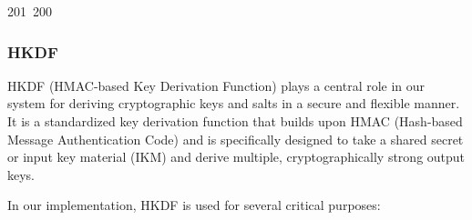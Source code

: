 201~200~\documentclass{article}
\begin{document}
	                                                                                                                                                                                                                                                                                                	                                                                                                                                        	    	                                                                                                	                                                                                                                                                                                                                                                \subsubsection{HKDF}

	                                                                                                                                                                                                                                                                                                	                                                                                                                                        	    	                                                                                                	                                                                                                                                                                                                                                                HKDF (HMAC-based Key Derivation Function) plays a central role in our system for deriving cryptographic keys and salts in a secure and flexible manner. It is a standardized key derivation function that builds upon HMAC (Hash-based Message Authentication Code) and is specifically designed to take a shared secret or input key material (IKM) and derive multiple, cryptographically strong output keys.

	                                                                                                                                                                                                                                                                                                	                                                                                                                                        	    	                                                                                                	                                                                                                                                                                                                                                                In our implementation, HKDF is used for several critical purposes:
\end{document}
